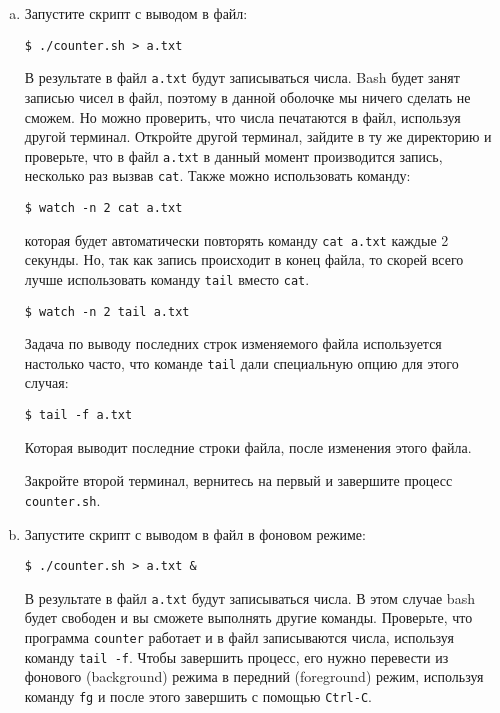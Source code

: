 \documentclass{article}
\begin{document}
\begin{enumerate}[(a)]
 
\item Запустите скрипт с выводом в файл: 
\begin{lstlisting}
$ ./counter.sh > a.txt
\end{lstlisting}
В результате в файл \texttt{a.txt} будут записываться числа. Bash будет занят записью чисел в файл, поэтому в данной оболочке мы ничего сделать не сможем. Но можно проверить, что числа печатаются в файл, используя другой терминал. Откройте другой терминал, зайдите в ту же директорию и проверьте, что в файл \texttt{a.txt} в данный момент производится запись, несколько раз вызвав \texttt{cat}. Также можно использовать команду:
\begin{lstlisting}
$ watch -n 2 cat a.txt
\end{lstlisting}
которая будет автоматически повторять команду \texttt{cat a.txt} каждые 2 секунды. Но, так как запись происходит в конец файла, то скорей всего лучше использовать команду \texttt{tail} вместо \texttt{cat}.
\begin{lstlisting}
$ watch -n 2 tail a.txt
\end{lstlisting}
Задача по выводу последних строк изменяемого файла используется настолько часто, что команде \texttt{tail} дали специальную опцию для этого случая:
\begin{lstlisting}
$ tail -f a.txt
\end{lstlisting}
Которая выводит последние строки файла, после изменения этого файла.

Закройте второй терминал, вернитесь на первый и завершите процесс \texttt{counter.sh}.


\item Запустите скрипт с выводом в файл в фоновом режиме:
\begin{lstlisting}
$ ./counter.sh > a.txt &
\end{lstlisting}
В результате в файл \texttt{a.txt} будут записываться числа. В этом случае bash будет свободен и вы сможете выполнять другие команды. Проверьте, что программа \texttt{counter} работает и в файл записываются числа, используя команду \texttt{tail -f}. 
Чтобы завершить процесс, его нужно перевести из фонового (background) режима в передний (foreground) режим, используя команду \texttt{fg} и после этого завершить с помощью \texttt{Ctrl-C}.


\end{enumerate}
\end{document}
